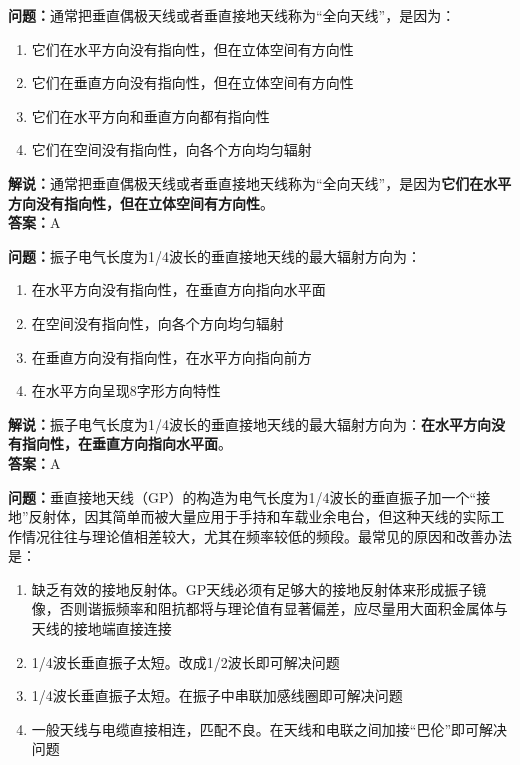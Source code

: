 \textbf{问题：}通常把垂直偶极天线或者垂直接地天线称为“全向天线”，是因为：

\begin{enumerate}[label=\Alph*), leftmargin=1cm]
	\item 它们在水平方向没有指向性，但在立体空间有方向性
	\item 它们在垂直方向没有指向性，但在立体空间有方向性
	\item 它们在水平方向和垂直方向都有指向性
	\item 它们在空间没有指向性，向各个方向均匀辐射
\end{enumerate}

\textbf{解说：}通常把垂直偶极天线或者垂直接地天线称为“全向天线”，是因为\textbf{它们在水平方向没有指向性，但在立体空间有方向性}。\\\textbf{答案：}A%



\textbf{问题：}振子电气长度为1/4波长的垂直接地天线的最大辐射方向为：

\begin{enumerate}[label=\Alph*), leftmargin=1cm]
	\item 在水平方向没有指向性，在垂直方向指向水平面
	\item 在空间没有指向性，向各个方向均匀辐射
	\item 在垂直方向没有指向性，在水平方向指向前方
	\item 在水平方向呈现8字形方向特性
\end{enumerate}

\textbf{解说：}振子电气长度为1/4波长的垂直接地天线的最大辐射方向为：\textbf{在水平方向没有指向性，在垂直方向指向水平面}。\\\textbf{答案：}A%



\textbf{问题：}垂直接地天线（GP）的构造为电气长度为1/4波长的垂直振子加一个“接地”反射体，因其简单而被大量应用于手持和车载业余电台，但这种天线的实际工作情况往往与理论值相差较大，尤其在频率较低的频段。最常见的原因和改善办法是：

\begin{enumerate}[label=\Alph*), leftmargin=1cm]
	\item 缺乏有效的接地反射体。GP天线必须有足够大的接地反射体来形成振子镜像，否则谐振频率和阻抗都将与理论值有显著偏差，应尽量用大面积金属体与天线的接地端直接连接
	\item 1/4波长垂直振子太短。改成1/2波长即可解决问题
	\item 1/4波长垂直振子太短。在振子中串联加感线圈即可解决问题
	\item 一般天线与电缆直接相连，匹配不良。在天线和电联之间加接“巴伦”即可解决问题
\end{enumerate}

